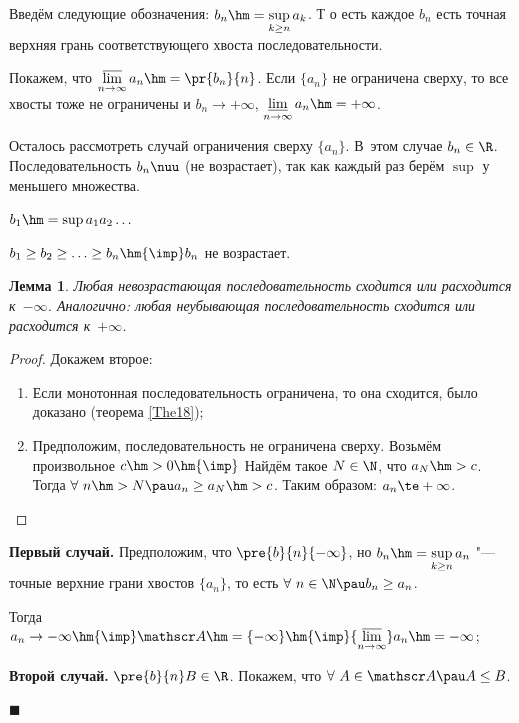 \documentclass[a4paper,10pt,twoside]{article}
\newtheorem{Th}{Лемма}[section]
\newenvironment{Proof}
       {\par\noindent{\textbf{Доказательство.}}}
       {\hfill$\scriptstyle\blacksquare$}
\begin{document}
\begin{Proof} Введём следующие обозначения: $b_n\hm=\sup\limits_{k\geq n}a_k$. Т
о есть  каждое $b_n$ есть точная верхняя грань соответствующего хвоста последовательности.

 Покажем, что $\varlimsup\limits_{n\to\infty}a_n\hm=\pr{b_n}{n}$. Если $\{a_n\}$ не ограничена сверху, то все хвосты тоже не ограничены и $b_n\to+\infty$,
$   \varliminf\limits_{n\to \infty}a_n\hm=+\infty$.

Осталось рассмотреть случай ограничения сверху $\{a_n\}$. 
В~этом случае $b_n\in \R$. Последовательность $b_n \nuu$ (не возрастает), так как каждый раз берём $\sup$  у меньшего множества.



$b_1\hm=\sup a_1a_2\ldots$

$b_1\geq b_2\geq\ldots\geq b_n\hm{\imp} b_n$ не возрастает.

\begin{Th}
Любая невозрастающая последовательность сходится или расходится к~$-\infty$.
 Аналогично: любая неубывающая последовательность сходится или расходится к~$+\infty$.
\end{Th}

\begin{proof}Докажем второе:
\begin{enumerate}

    \item Если монотонная последовательность ограничена, то она сходится, было доказано (теорема \ref{The18});

    \item Предположим, последовательность не ограничена сверху. Возьмём произвольное $c\hm>0\hm{\imp}$ Найдём такое $N\in \N$,
         что $a_N\hm>c$.
        Тогда $\forall\  n\hm>N\pau a_n\geq a_N\hm>c$. Таким образом:  $a_n\te+\infty$.
\end{enumerate}

\end{proof}
    \textbf{Первый случай.} Предположим, что $\pre{b}{n}{-\infty}$, но $b_n\hm=\sup\limits_{k\geq n}a_n$ "--- точные верхние грани хвостов $\{a_n\}$, то есть  $\forall\  n\in\N\pau b_n\geq a_n$.

     Тогда $a_n\to-\infty\hm{\imp} \mathscr A\hm=\{-\infty\}
    \hm{\imp}{\varlimsup\limits_{n\to\infty}}a_n\hm=-\infty$;

    \textbf{Второй случай.} $\pre{b}{n}B\in\R$. Покажем, что $\forall\  A\in\mathscr A \pau A\leq B$.


\end{Proof}
\end{document}
